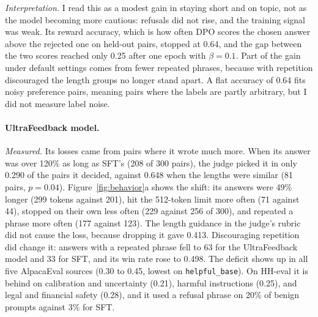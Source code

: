 \emph{Interpretation.} I read this as a modest gain in staying short and on topic, not as the model becoming more cautious: refusals did not rise, and the training signal was weak. Its reward accuracy, which is how often DPO scores the chosen answer above the rejected one on held-out pairs, stopped at 0.64, and the gap between the two scores reached only 0.25 after one epoch with $\beta=0.1$. Part of the gain under default settings comes from fewer repeated phrases, because with repetition discouraged the length groups no longer stand apart. A flat accuracy of 0.64 fits noisy preference pairs, meaning pairs where the labels are partly arbitrary, but I did not measure label noise.

\paragraph{UltraFeedback model.} \emph{Measured.} Its losses came from pairs where it wrote much more. When its answer was over 120\% as long as SFT's (208 of 300 pairs), the judge picked it in only 0.290 of the pairs it decided, against 0.648 when the lengths were similar (81 pairs, $p=0.04$). Figure~\ref{fig:behavior}a shows the shift: its answers were 49\% longer (299 tokens against 201), hit the 512-token limit more often (71 against 44), stopped on their own less often (229 against 256 of 300), and repeated a phrase more often (177 against 123). The length guidance in the judge's rubric did not cause the loss, because dropping it gave 0.413. Discouraging repetition did change it: answers with a repeated phrase fell to 63 for the UltraFeedback model and 33 for SFT, and its win rate rose to 0.498. The deficit shows up in all five AlpacaEval sources (0.30 to 0.45, lowest on \texttt{helpful\_base}). On HH-eval it is behind on calibration and uncertainty (0.21), harmful instructions (0.25), and legal and financial safety (0.28), and it used a refusal phrase on 20\% of benign prompts against 3\% for SFT.

